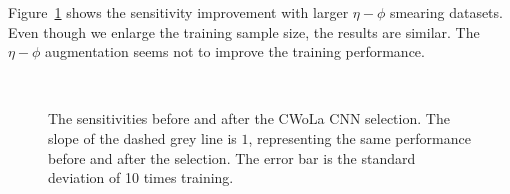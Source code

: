 \documentclass[12pt]{article}
\begin{document}
        Figure~\ref{fig:sensitivity_improvement_origin_eta_phi_aug_1_3} shows the sensitivity improvement with larger $\eta-\phi$ smearing datasets. Even though we enlarge the training sample size, the results are similar. The $\eta-\phi$ augmentation seems not to improve the training performance.
        \begin{figure}[htpb]
            \centering
             \\
            \caption{The sensitivities before and after the CWoLa CNN selection. The slope of the dashed grey line is $1$, representing the same performance before and after the selection. The error bar is the standard deviation of 10 times training.}
            \label{fig:sensitivity_improvement_origin_eta_phi_aug_1_3}
        \end{figure}
\end{document}
